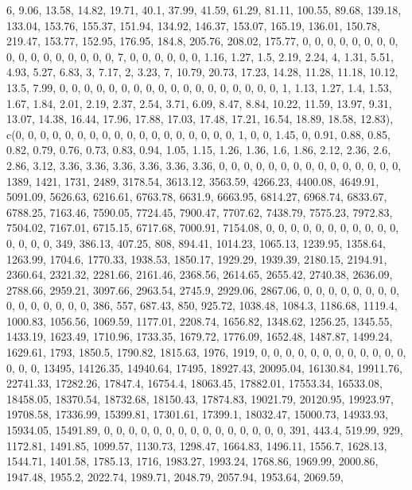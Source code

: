 \documentclass[
]{article}
\begin{document}
6, 9.06, 13.58, 14.82, 19.71, 40.1, 37.99, 41.59, 61.29, 81.11, 100.55,
89.68, 139.18, 133.04, 153.76, 155.37, 151.94, 134.92, 146.37, 153.07,
165.19, 136.01, 150.78, 219.47, 153.77, 152.95, 176.95, 184.8, 205.76,
208.02, 175.77, 0, 0, 0, 0, 0, 0, 0, 0, 0, 0, 0, 0, 0, 0, 0, 0, 0, 7, 0,
0, 0, 0, 0, 0, 1.16, 1.27, 1.5, 2.19, 2.24, 4, 1.31, 5.51, 4.93, 5.27,
6.83, 3, 7.17, 2, 3.23, 7, 10.79, 20.73, 17.23, 14.28, 11.28, 11.18,
10.12, 13.5, 7.99, 0, 0, 0, 0, 0, 0, 0, 0, 0, 0, 0, 0, 0, 0, 0, 0, 0, 0,
1, 1.13, 1.27, 1.4, 1.53, 1.67, 1.84, 2.01, 2.19, 2.37, 2.54, 3.71,
6.09, 8.47, 8.84, 10.22, 11.59, 13.97, 9.31, 13.07, 14.38, 16.44, 17.96,
17.88, 17.03, 17.48, 17.21, 16.54, 18.89, 18.58, 12.83), c(0, 0, 0, 0,
0, 0, 0, 0, 0, 0, 0, 0, 0, 0, 0, 0, 0, 0, 1, 0, 0, 1.45, 0, 0.91, 0.88,
0.85, 0.82, 0.79, 0.76, 0.73, 0.83, 0.94, 1.05, 1.15, 1.26, 1.36, 1.6,
1.86, 2.12, 2.36, 2.6, 2.86, 3.12, 3.36, 3.36, 3.36, 3.36, 3.36, 3.36,
0, 0, 0, 0, 0, 0, 0, 0, 0, 0, 0, 0, 0, 0, 0, 1389, 1421, 1731, 2489,
3178.54, 3613.12, 3563.59, 4266.23, 4400.08, 4649.91, 5091.09, 5626.63,
6216.61, 6763.78, 6631.9, 6663.95, 6814.27, 6968.74, 6833.67, 6788.25,
7163.46, 7590.05, 7724.45, 7900.47, 7707.62, 7438.79, 7575.23, 7972.83,
7504.02, 7167.01, 6715.15, 6717.68, 7000.91, 7154.08, 0, 0, 0, 0, 0, 0,
0, 0, 0, 0, 0, 0, 0, 0, 0, 349, 386.13, 407.25, 808, 894.41, 1014.23,
1065.13, 1239.95, 1358.64, 1263.99, 1704.6, 1770.33, 1938.53, 1850.17,
1929.29, 1939.39, 2180.15, 2194.91, 2360.64, 2321.32, 2281.66, 2161.46,
2368.56, 2614.65, 2655.42, 2740.38, 2636.09, 2788.66, 2959.21, 3097.66,
2963.54, 2745.9, 2929.06, 2867.06, 0, 0, 0, 0, 0, 0, 0, 0, 0, 0, 0, 0,
0, 0, 0, 386, 557, 687.43, 850, 925.72, 1038.48, 1084.3, 1186.68,
1119.4, 1000.83, 1056.56, 1069.59, 1177.01, 2208.74, 1656.82, 1348.62,
1256.25, 1345.55, 1433.19, 1623.49, 1710.96, 1733.35, 1679.72, 1776.09,
1652.48, 1487.87, 1499.24, 1629.61, 1793, 1850.5, 1790.82, 1815.63,
1976, 1919, 0, 0, 0, 0, 0, 0, 0, 0, 0, 0, 0, 0, 0, 0, 0, 13495,
14126.35, 14940.64, 17495, 18927.43, 20095.04, 16130.84, 19911.76,
22741.33, 17282.26, 17847.4, 16754.4, 18063.45, 17882.01, 17553.34,
16533.08, 18458.05, 18370.54, 18732.68, 18150.43, 17874.83, 19021.79,
20120.95, 19923.97, 19708.58, 17336.99, 15399.81, 17301.61, 17399.1,
18032.47, 15000.73, 14933.93, 15934.05, 15491.89, 0, 0, 0, 0, 0, 0, 0,
0, 0, 0, 0, 0, 0, 0, 0, 391, 443.4, 519.99, 929, 1172.81, 1491.85,
1099.57, 1130.73, 1298.47, 1664.83, 1496.11, 1556.7, 1628.13, 1544.71,
1401.58, 1785.13, 1716, 1983.27, 1993.24, 1768.86, 1969.99, 2000.86,
1947.48, 1955.2, 2022.74, 1989.71, 2048.79, 2057.94, 1953.64, 2069.59,
\end{document}
